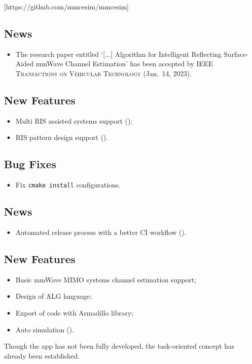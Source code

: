 [https://github.com/mmcesim/mmcesim]
\subsection*{News}
\begin{itemize}
  \item The research paper entitled `[...] Algorithm for Intelligent Reflecting Surface-Aided mmWave Channel Estimation' has been accepted by \textsc{IEEE Transactions on Vehicular Technology} (Jan.~14, 2023).
\end{itemize}

\subsection*{New Features}
\begin{itemize}
  \item Multi RIS assisted systems support ();
  \item RIS pattern design support ().
\end{itemize}
\subsection*{Bug Fixes}
\begin{itemize}
  \item Fix \texttt{cmake install} configurations.
\end{itemize}
\subsection*{News}
\begin{itemize}
  \item Automated release process with a better CI workflow ().
\end{itemize}

\subsection*{New Features}
\begin{itemize}
  \item Basic mmWave MIMO systems channel estimation support;
  \item Design of ALG language;
  \item Export of code with Armadillo library;
  \item Auto simulation ().
\end{itemize}

Though the app has not been fully developed,
the task-oriented concept has already been established.

